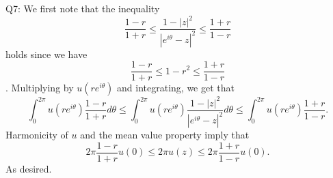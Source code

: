 \documentclass[letterpaper]{article}
\begin{document}
 \noindent Q7: 
We first note that the inequality $$\frac{1-r}{1+r} \leq \frac{1-|z|^2}{|e^{i \theta } - z|^2} \leq \frac{1+r}{1-r}$$ holds since we have $$\frac{1-r}{1+r} \leq 1-r^2 \leq \frac{1+r}{1-r}$$. 
Multiplying by $u(re^{i\theta})$ and integrating, we get that $$\int_0^{2\pi} u(re^{i \theta}) \frac{1-r}{1+r} d\theta \leq \int_0^{2\pi} u(re^{i\theta}) \frac{1-|z|^2}{|e^{i \theta } - z|^2} d\theta \leq \int_0^{2\pi} u(re^{i\theta}) \frac{1+r}{1-r}. $$
Harmonicity of $u$ and the mean value property imply that $$2\pi\frac{1-r}{1+r} u(0) \leq 2\pi u(z) \leq 2\pi \frac{1+r}{1-r}u(0).$$ As desired. 
\end{document}
